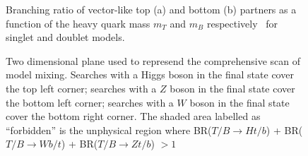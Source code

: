 \begin{figure}[h!tb]\begin{center}
	\caption{Branching ratio of vector-like top (a) and bottom (b) partners as a function of the heavy quark mass $m_T$ and $m_B$ respectively~\cite{ATLAS-CONF-2013-056} for singlet and doublet models.\label{fig:vlqBRs}}
\end{center}\end{figure}

\begin{figure}[h!bt]\begin{center}
	\subfigure{
        }
       	\caption{Two dimensional plane used to represend the comprehensive scan of model mixing. Searches 
        with a Higgs boson in the final state cover the top left corner; searches with a $Z$ boson in the 
        final state cover the bottom left corner; searches with a $W$ boson in the final state cover the 
        bottom right corner. The shaded area labelled as ``forbidden'' is the unphysical region where
        BR($T/B\to Ht/b$) + BR($T/B\to Wb/t$) + BR($T/B\to  Zt/b$) $>1$ \label{fig:2dplane}}
\end{center}\end{figure}


